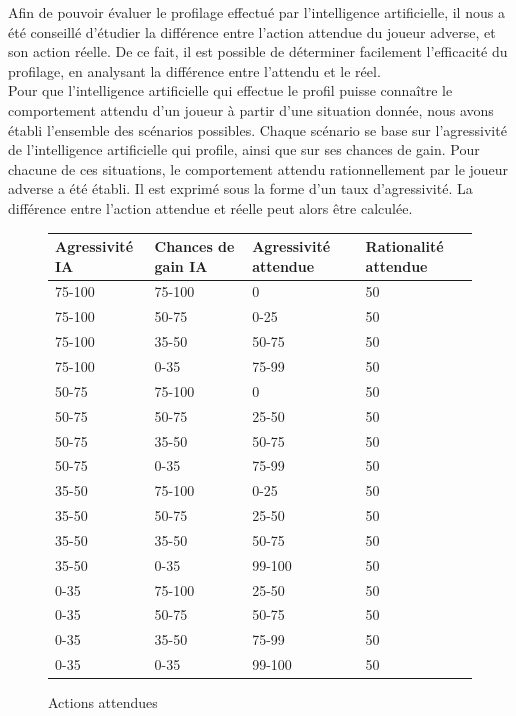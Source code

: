 \documentclass{report}
\begin{document}
\hspace{0.5cm}Afin de pouvoir évaluer le profilage effectué par l'intelligence artificielle, il nous a été conseillé d'étudier la différence entre l'action attendue du joueur adverse, et son action réelle. De ce fait, il est possible de déterminer facilement l'efficacité du profilage, en analysant la différence entre l'attendu et le réel.\\

Pour que l'intelligence artificielle qui effectue le profil puisse connaître le comportement attendu d'un joueur à partir d'une situation donnée, nous avons établi l'ensemble des scénarios possibles. Chaque scénario se base sur l'agressivité de l'intelligence artificielle qui profile, ainsi que sur ses chances de gain. Pour chacune de ces situations, le comportement attendu rationnellement par le joueur adverse a été établi. Il est exprimé sous la forme d'un taux d'agressivité. La différence entre l’action attendue et réelle peut alors être calculée.

\begin{figure}[H]
\begin{center}
\begin{tabular}{|l|l|l|l|}
	\hline
   Agressivité IA & Chances de gain IA & Agressivité attendue & Rationalité attendue\\
   \hline
   75-100 & 75-100 & 0 & 50\\
   \hline
   75-100 & 50-75 & 0-25 & 50\\
   \hline
   75-100 & 35-50 & 50-75 & 50\\
   \hline
   75-100 & 0-35 & 75-99 & 50\\
   \hline
   50-75 & 75-100 & 0 & 50\\
   \hline
   50-75 & 50-75 & 25-50 & 50\\
   \hline
   50-75 & 35-50 & 50-75 & 50\\
   \hline
   50-75 & 0-35 & 75-99 & 50\\
   \hline
   35-50 & 75-100 & 0-25 & 50\\
   \hline
   35-50 & 50-75 & 25-50 & 50\\
   \hline
   35-50 & 35-50 & 50-75 & 50\\
   \hline
   35-50 & 0-35 & 99-100 & 50\\
   \hline
   0-35	 & 75-100 & 25-50 & 50\\
   \hline
   0-35 & 50-75 & 50-75 & 50\\
   \hline
   0-35 & 35-50 & 75-99 & 50\\
   \hline
   0-35 & 0-35 & 99-100 & 50\\
   \hline
\end{tabular}	
\end{center}
\caption{Actions attendues}
\end{figure}
\end{document}
